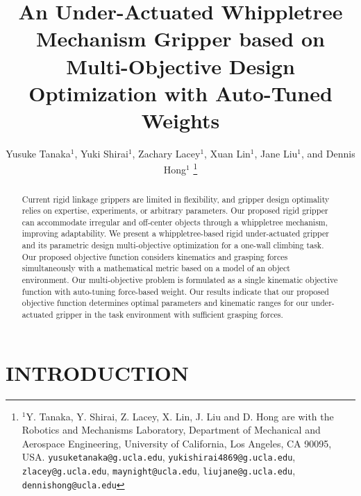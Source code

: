 \documentclass[letterpaper, 10 pt, conference]{ieeeconf}  %
\title{\LARGE \bf
An Under-Actuated Whippletree Mechanism Gripper based on Multi-Objective Design Optimization with Auto-Tuned Weights
}
\author{Yusuke Tanaka$^{1}$, Yuki Shirai$^{1}$, Zachary Lacey$^{1}$, Xuan Lin$^{1}$, Jane Liu$^{1}$, and Dennis Hong$^{1}$%
\thanks{$^{1}$Y. Tanaka, Y. Shirai, Z. Lacey, X. Lin, J. Liu and D. Hong are with the Robotics and Mechanisms Laboratory, Department of Mechanical and Aerospace Engineering, University of California, Los Angeles, CA 90095, USA.
       {\tt\small yusuketanaka@g.ucla.edu}, {\tt\small yukishirai4869@g.ucla.edu}, {\tt\small zlacey@g.ucla.edu}, {\tt\small maynight@ucla.edu}, {\tt\small liujane@g.ucla.edu}, {\tt\small dennishong@ucla.edu}
        }
}
\begin{document}
\maketitle
\thispagestyle{empty}
\pagestyle{empty}



\begin{abstract}
Current rigid linkage grippers are limited in flexibility, and gripper design optimality relies on expertise, experiments, or arbitrary parameters. 
Our proposed rigid gripper can accommodate irregular and off-center objects through a whippletree mechanism, improving adaptability. We present a whippletree-based rigid under-actuated gripper and its parametric design multi-objective optimization for a one-wall climbing task. Our proposed objective function considers kinematics and grasping forces simultaneously with a mathematical metric based on a model of an object environment.
Our multi-objective problem is formulated as a single kinematic objective function with auto-tuning force-based weight. Our results indicate that our proposed objective function determines optimal parameters and kinematic ranges for our under-actuated gripper in the task environment with sufficient grasping forces. 

\end{abstract}


\section{INTRODUCTION}
\end{document}
